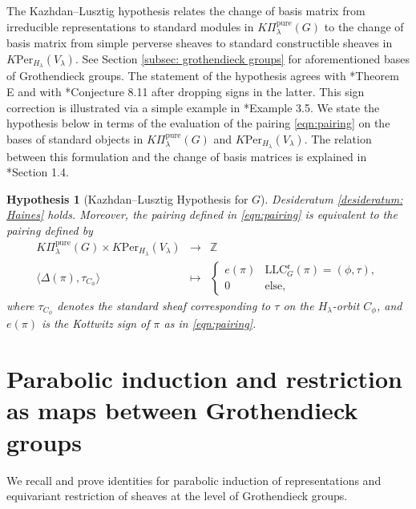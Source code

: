 \documentclass[11pt,letterpaper]{amsart}
\newcommand{\pure}{\mathrm{pure}}
\newcommand{\LLC}{\mathrm{LLC}}
\newcommand{\Per}{\mathrm{Per}}
\newcommand{\stsh}[2]{{#1}_{#2}}
\newtheorem {hypothesis}[thm]{Hypothesis}
\renewcommand{\1}{\mathbbm{1}}
\numberwithin{equation}{section}
\begin{document}
{The Kazhdan--Lusztig hypothesis relates the change of basis matrix from irreducible representations to standard modules in $K\Pi_\lambda^\pure(G)$ to the change of basis matrix from simple perverse sheaves to standard constructible sheaves in $K\Per_{H_\lambda}(V_\lambda)$. See Section \ref{subsec: grothendieck groups} for aforementioned bases of Grothendieck groups. The statement of the hypothesis agrees with \cite{Sol25}*{Theorem E} and with \cite{Vog93}*{Conjecture 8.11} after dropping signs in the latter. This sign correction 
is illustrated via a simple example in \cite{balodis2026proofpadickazhdanlusztighypothesis}*{Example 3.5}. We state the hypothesis below in terms of the evaluation of the pairing \eqref{eqn:pairing} on the bases of standard objects in $K\Pi_\lambda^\pure(G)$ and $K\Per_{H_\lambda}(V_\lambda)$. The relation between this formulation and the change of basis matrices is explained in \cite{CunninghamRayVoganGLn}*{Section 1.4}.

 

\begin{hypothesis}[Kazhdan--Lusztig Hypothesis for $G$]\label{hypothesis: KLH}
Desideratum \ref{desideratum: Haines} holds. Moreover, the pairing defined in \eqref{eqn:pairing} is equivalent to the pairing defined by
\begin{equation}\label{equation: pairing on standards}
    \begin{array}{rcl}
        K\Pi_\lambda^\pure(G) \times K\Per_{H_\lambda}(V_\lambda)
            &\to& \mathbb{Z}\\
        \langle \Delta(\pi), \stsh{\tau}{C_{\phi}} \rangle 
            &\mapsto& 
            \begin{cases}
                e(\pi) & \LLC^{\mathfrak{e}}_G(\pi) = (\phi,\tau), \\
                0 & \text{else},
            \end{cases}
    \end{array}
\end{equation}
where $\stsh{\tau}{C_\phi}$ denotes the standard sheaf corresponding to $\tau$ on the $H_\lambda$-orbit $C_\phi$, and $e(\pi)$ is the Kottwitz sign of $\pi$ as in \eqref{eqn:pairing}. 
\end{hypothesis}

\section{Parabolic induction and restriction as maps between Grothendieck groups}
We recall and prove identities for parabolic induction of representations and equivariant restriction of sheaves at the level of Grothendieck groups.

}
\end{document}

